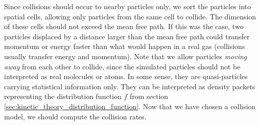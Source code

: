 Since collisions should occur to nearby particles only, we sort the particles into spatial cells, allowing only particles from the same cell to collide. The dimension of these cells should not exceed the mean free path. If this was the case, two particles displaced by a distance larger than the mean free path could transfer momentum or energy faster than what would happen in a real gas (collisions usually transfer energy and momentum). Note that we allow particles \textit{moving away} from each other to collide, since the simulated particles should not be interpreted as real molecules or atoms. In some sense, they are quasi-particles carrying statistical information only. They can be interpreted as density packets representing the distribution function $f$ from section \ref{sec:kinetic_theory_distribution_function}. Now that we have chosen a collision model, we should compute the collision rates.

